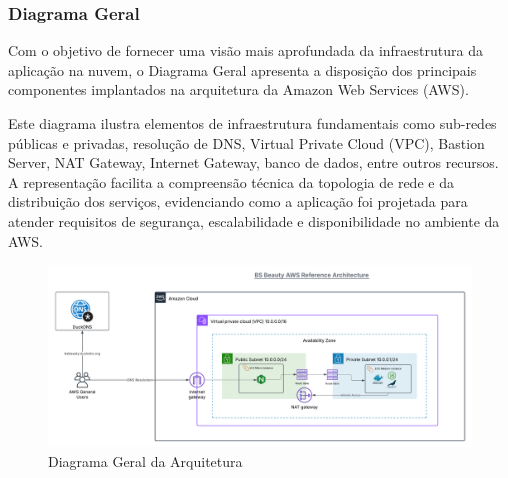 \subsubsection{Diagrama Geral}

Com o objetivo de fornecer uma visão mais aprofundada da infraestrutura da aplicação na nuvem, o Diagrama Geral apresenta a disposição dos principais componentes implantados na arquitetura da Amazon Web Services (AWS). 

Este diagrama ilustra elementos de infraestrutura fundamentais como sub-redes públicas e privadas, resolução de DNS, Virtual Private Cloud (VPC), Bastion Server, NAT Gateway, Internet Gateway, banco de dados, entre outros recursos. A representação facilita a compreensão técnica da topologia de rede e da distribuição dos serviços, evidenciando como a aplicação foi projetada para atender requisitos de segurança, escalabilidade e disponibilidade no ambiente da AWS.

\begin{figure}[htb]
  \centering
  \includegraphics[width=\textwidth]{cap04-desenvolvimento/images/4-3-2-3-diagrama-geral}
  \caption{Diagrama Geral da Arquitetura}
  \label{fig:diagrama-geral}
\end{figure}
